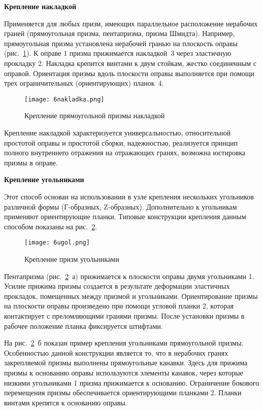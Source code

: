 \begin{flushleft}
	\textbf{Крепление накладкой}
\end{flushleft}

Применяется для любых призм, имеющих параллельное расположение нерабочих граней (прямоугольная призма, пентапризма, призма Шмидта). Например, прямоугольная призма установлена нерабочей гранью на плоскость оправы (рис.~\ref{pic:6nakladka}). К оправе 1 призма прижимается накладкой~3 через эластичную прокладку 2. Накладка крепится винтами к двум стойкам, жестко соединенным с оправой. Ориентация призмы вдоль плоскости оправы выполняется при помощи трех ограничительных (ориентирующих) планок~4.

\begin{figure}[h!]
	\caption{ Крепление прямоугольной призмы накладкой }
	\texttt{[image: 6nakladka.png]}
	\label{pic:6nakladka}
\end{figure}

Крепление накладкой характеризуется универсальностью, относительной простотой оправы и простотой сборки, надежностью, реализуется принцип полного внутреннего отражения на отражающих гранях, возможна юстировка призмы в оправе.

\begin{flushleft}
	\textbf{Крепление угольниками}
\end{flushleft}

Этот способ основан на использовании в узле крепления нескольких угольников различной формы (Г-образных, Z-образных). Дополнительно к угольникам применяют ориентирующие планки. Типовые конструкции крепления данным способом показаны на рис.~\ref{pic:6ugol}.

\begin{figure}[h!]
	\caption{ Крепление призм угольниками }
	\texttt{[image: 6ugol.png]}
	\label{pic:6ugol}
\end{figure}

Пентапризма (рис.~\ref{pic:6ugol}~а) прижимается к плоскости оправы двумя угольниками 1. Усилие прижима призмы создается в результате деформации эластичных прокладок, помещенных между призмой и угольниками. Ориентирование призмы на плоскости оправы произведено при помощи угловой планки 2, которая контактирует с преломляющими гранями призмы. После установки призмы в рабочее положение планка фиксируется штифтами.

На рис.~\ref{pic:6ugol}~б показан пример крепления угольниками прямоугольной призмы. Особенностью данной конструкции является то, что в нерабочих гранях закрепляемой призмы выполнены прямоугольные канавки. Здесь для прижима призмы к основанию оправы используются элементы канавок, через которые низкими угольниками 1 призма прижимается к основанию. Ограничение бокового перемещения призмы обеспечивается ориентирующими планками 2. Планки винтами крепятся к основанию оправы.

